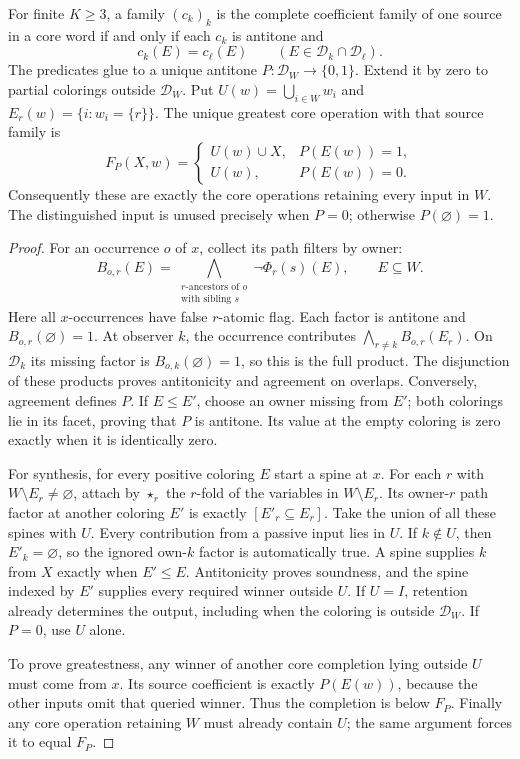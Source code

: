 \begin{theorem}
\label{core:thm:source-completion}
For finite $K\geq3$, a family $(c_k)_k$ is the complete coefficient
family of one source in a core word if and only if each $c_k$ is
antitone and
\[
 c_k(E)=c_\ell(E)\qquad(E\in\mathcal D_k\cap\mathcal D_\ell).
\]
The predicates glue to a unique antitone $P:\mathcal D_W\to\{0,1\}$.
Extend it by zero to partial colorings outside $\mathcal D_W$.
Put $U(w)=\bigcup_{i\in W}w_i$ and $E_r(w)=\{i:w_i=\{r\}\}$.
The unique greatest core operation with that source family is
\[
 F_P(X,w)=
 \begin{cases}
 U(w)\cup X,&P(E(w))=1,\\
 U(w),&P(E(w))=0.
 \end{cases}
\]
Consequently these are exactly the core operations retaining every
input in $W$. The distinguished input is unused precisely when $P=0$;
otherwise $P(\varnothing)=1$.
\end{theorem}
\begin{proof}
For an occurrence $o$ of $x$, collect its path filters by owner:
\[
 B_{o,r}(E)=\bigwedge_{\substack{\text{$r$-ancestors of }o\\
                          \text{with sibling }s}}
       \neg\Phi_r(s)(E),\qquad E\subseteq W.
\]
Here all $x$-occurrences have false $r$-atomic flag. Each factor is
antitone and $B_{o,r}(\varnothing)=1$. At observer $k$, the occurrence
contributes $\bigwedge_{r\ne k}B_{o,r}(E_r)$. On $\mathcal D_k$ its
missing factor is $B_{o,k}(\varnothing)=1$, so this is the full product.
The disjunction of these products proves antitonicity and agreement on
overlaps. Conversely, agreement defines $P$. If $E\leq E'$, choose an
owner missing from $E'$; both colorings lie in its facet, proving that
$P$ is antitone. Its value at the empty coloring is zero exactly when
it is identically zero.

For synthesis, for every positive coloring $E$ start a spine at $x$.
For each $r$ with $W\setminus E_r\ne\varnothing$, attach by $\star_r$
the $r$-fold of the variables in $W\setminus E_r$. Its owner-$r$ path
factor at another coloring $E'$ is exactly $[E'_r\subseteq E_r]$.
Take the union of all these spines with $U$. Every contribution from
a passive input lies in $U$. If $k\notin U$, then $E'_k=\varnothing$,
so the ignored own-$k$ factor is automatically true. A spine supplies
$k$ from $X$ exactly when $E'\leq E$. Antitonicity proves soundness,
and the spine indexed by $E'$ supplies every required winner outside
$U$. If $U=I$, retention already determines the output, including when
the coloring is outside $\mathcal D_W$. If $P=0$, use $U$ alone.

To prove greatestness, any winner of another core completion lying
outside $U$ must come from $x$. Its source coefficient is exactly
$P(E(w))$, because the other inputs omit that queried winner. Thus the
completion is below $F_P$. Finally any core operation retaining $W$
must already contain $U$; the same argument forces it to equal $F_P$.
\end{proof}

